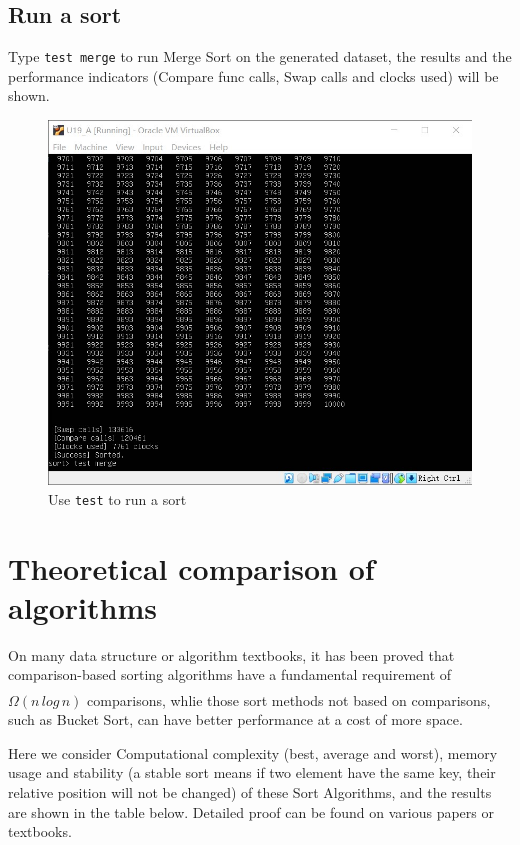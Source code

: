 \documentclass[cn,black,12pt,normal]{elegantnote}
\newcommand{\uct}[1]{\textsuperscript{\textsuperscript{\cite{#1}}}}
\begin{document}
\subsection{Run a sort}

Type \lstinline{test merge} to run Merge Sort on the generated dataset, the results and the performance indicators (Compare func calls, Swap calls and clocks used) will be shown.

\begin{figure}[H]
    \centering
    \includegraphics[width=0.7\linewidth]{image/sort_04.jpg}
    \caption{Use \lstinline{test} to run a sort}
\end{figure}

\section{Theoretical comparison of algorithms}

On many data structure or algorithm textbooks, it has been proved that comparison-based sorting algorithms have a fundamental requirement of $\Omega(n \, log \, n) $ comparisons,\uct{cormen2009introduction} whlie those sort methods not based on comparisons, such as Bucket Sort, can have better performance at a cost of more space.

Here we consider Computational complexity (best, average and worst), memory usage and stability (a stable sort means if two element have the same key, their relative position will not be changed) of these Sort Algorithms, and the results are shown in the table below. Detailed proof can be found on various papers or textbooks.
\end{document}
